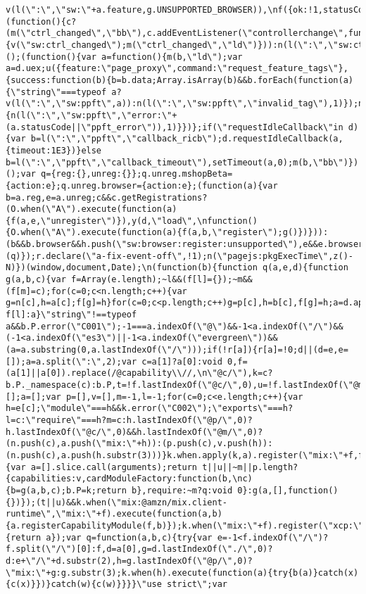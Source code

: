 \documentclass[
]{article}
\begin{document}
\begin{verbatim}
v(l(\":\",\"sw:\"+a.feature,g.UNSUPPORTED_BROWSER)),\nf({ok:!1,statusCode:g.UNSUPPORTED_BROWSER,done:!0})};(function(){c?(m(\"ctrl_changed\",\"bb\"),c.addEventListener(\"controllerchange\",function(){v(\"sw:ctrl_changed\");m(\"ctrl_changed\",\"ld\")})):n(l(\":\",\"sw:ctrl_changed\",\"sw_unsupp\"),1)})();(function(){var a=function(){m(b,\"ld\");var a=d.uex;u({feature:\"page_proxy\",command:\"request_feature_tags\"},{success:function(b){b=b.data;Array.isArray(b)&&b.forEach(function(a){\"string\"===typeof a?v(l(\":\",\"sw:ppft\",a)):n(l(\":\",\"sw:ppft\",\"invalid_tag\"),1)});n(l(\":\",\"sw:ppft\",\n\"success\"),1);x&&x.isl&&t(a)&&a(\"at\")},failure:function(a){n(l(\":\",\"sw:ppft\",\"error:\"+(a.statusCode||\"ppft_error\")),1)}})};if(\"requestIdleCallback\"in d){var b=l(\":\",\"ppft\",\"callback_ricb\");d.requestIdleCallback(a,{timeout:1E3})}else b=l(\":\",\"ppft\",\"callback_timeout\"),setTimeout(a,0);m(b,\"bb\")})();var q={reg:{},unreg:{}};q.unreg.mshopBeta={action:e};q.unreg.browser={action:e};(function(a){var b=a.reg,e=a.unreg;c&&c.getRegistrations?(O.when(\"A\").execute(function(a){f(a,e,\"unregister\")}),y(d,\"load\",\nfunction(){O.when(\"A\").execute(function(a){f(a,b,\"register\");g()})})):(b&&b.browser&&h.push(\"sw:browser:register:unsupported\"),e&&e.browser&&h.push(\"sw:browser:unregister:unsupported\"),g())})(q)});r.declare(\"a-fix-event-off\",!1);n(\"pagejs:pkgExecTime\",z()-N)})(window,document,Date);\n(function(b){function q(a,e,d){function g(a,b,c){var f=Array(e.length);~l&&(f[l]={});~m&&(f[m]=c);for(c=0;c<n.length;c++){var g=n[c],h=a[c];f[g]=h}for(c=0;c<p.length;c++)g=p[c],h=b[c],f[g]=h;a=d.apply(null,f);return~l?f[l]:a}\"string\"!==typeof a&&b.P.error(\"C001\");-1===a.indexOf(\"@\")&&-1<a.indexOf(\"/\")&&(-1<a.indexOf(\"es3\")||-1<a.indexOf(\"evergreen\"))&&(a=a.substring(0,a.lastIndexOf(\"/\")));if(!r[a]){r[a]=!0;d||(d=e,e=[]);a=a.split(\":\",2);var c=a[1]?a[0]:void 0,f=(a[1]||a[0]).replace(/@capability\\//,\n\"@c/\"),k=c?b.P._namespace(c):b.P,t=!f.lastIndexOf(\"@c/\",0),u=!f.lastIndexOf(\"@m/\",0),n=[];a=[];var p=[],v=[],m=-1,l=-1;for(c=0;c<e.length;c++){var h=e[c];\"module\"===h&&k.error(\"C002\");\"exports\"===h?l=c:\"require\"===h?m=c:h.lastIndexOf(\"@p/\",0)?h.lastIndexOf(\"@c/\",0)&&h.lastIndexOf(\"@m/\",0)?(n.push(c),a.push(\"mix:\"+h)):(p.push(c),v.push(h)):(n.push(c),a.push(h.substr(3)))}k.when.apply(k,a).register(\"mix:\"+f,function(){var a=[].slice.call(arguments);return t||u||~m||p.length?{capabilities:v,cardModuleFactory:function(b,\nc){b=g(a,b,c);b.P=k;return b},require:~m?q:void 0}:g(a,[],function(){})});(t||u)&&k.when(\"mix:@amzn/mix.client-runtime\",\"mix:\"+f).execute(function(a,b){a.registerCapabilityModule(f,b)});k.when(\"mix:\"+f).register(\"xcp:\"+f,function(a){return a});var q=function(a,b,c){try{var e=-1<f.indexOf(\"/\")?f.split(\"/\")[0]:f,d=a[0],g=d.lastIndexOf(\"./\",0)?d:e+\"/\"+d.substr(2),h=g.lastIndexOf(\"@p/\",0)?\"mix:\"+g:g.substr(3);k.when(h).execute(function(a){try{b(a)}catch(x){c(x)}})}catch(w){c(w)}}}}\"use strict\";var 
\end{verbatim}
\end{document}
